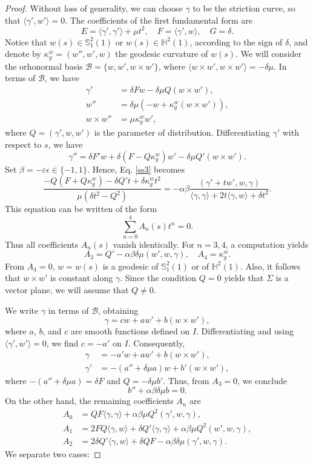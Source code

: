 \documentclass[a4paper,12pt]{amsart}
\theoremstyle{definition}
\def\h{\mathbb H}
\def\s{\mathbb S}
\begin{document}
\begin{proof}
Without loss of generality, we can choose $\gamma$ to be the striction curve, so that $ \langle \gamma',w'\rangle=0$. The coefficients of  the first fundamental form are
$$
E=\langle \gamma',\gamma' \rangle +\mu t^2, \quad F=\langle \gamma',w\rangle, \quad G=\delta.
$$ 
Notice that $w(s)\in \s_1^2(1)$ or $w(s)\in \h^2(1)$, according to the sign of $\delta$, and denote by $\kappa_g^w=(w'',w',w)$ the geodesic curvature of $w(s)$. We will consider the orhonormal basis $\mathcal{B}=\{w,w',w\times w' \}$, where $\langle w\times w', w\times w' \rangle =-\delta \mu$. In terms of $\mathcal{B}$, we have
\begin{align*}
\gamma'&=\delta F w-\delta \mu Q (w \times w'), \\
w''&=\delta \mu (-w+\kappa_g^w(w\times w')), \\
w\times w''&=\mu \kappa_g^w w',
\end{align*}
where $Q=(\gamma',w,w')$ is the parameter of distribution. Differentiating $\gamma'$ with respect to $s$, we have
$$
\gamma''=\delta F'w +\delta (F-Q\kappa_g^w)w'-\delta \mu Q' (w\times w').
$$
Set $\beta=-\varepsilon \epsilon \in \{-1,1\}.$ Hence, Eq. \eqref{ss3} becomes
$$
\frac{-Q(F+Q\kappa_g^w)-\delta Q' t +\delta \kappa_g^wt^2}{\mu (\delta t^2-Q^2)}=-\alpha\beta\frac{(\gamma'+tw',w,\gamma)}{\langle \gamma,\gamma\rangle+2t\langle \gamma,w\rangle+\delta t^2}.
$$ 
This equation can be written  of the form $$\sum_{n=0}^4A_n(s)t^n=0.$$ 
Thus all coefficients   $A_n(s)$ vanish identically. For $n=3,4$, a computation yields 
$$
A_3=Q'-\alpha\beta\delta\mu(w',w,\gamma), \quad A_4=\kappa_g^w.
$$
From $A_4=0$,  $w=w(s)$ is a geodesic of $\s_1^2(1)$ or of $ \h^2(1)$. Also, it follows that $w\times w'$ is constant along $\gamma$. Since the condition $Q=0$ yields that $\Sigma$ is a vector plane, we will assume that $Q\neq 0$.

We write $\gamma$ in terms of $\mathcal{B}$, obtaining 
$$
\gamma=cw+aw'+b(w\times w'),
$$
where $a$, $b$, and $c$ are smooth functions defined on $I$.  Differentiating and using $\langle \gamma',w'\rangle=0$, we find $c=-a'$ on $I$. Consequently, 
\begin{align*}
\gamma&=-a'w+aw'+b(w\times w'), \\
\gamma'&=-(a''+\delta\mu a)w+b'(w\times w'),
\end{align*}
where $-(a''+\delta\mu a)=\delta F$ and $Q=-\delta\mu b'$. Thus, from $A_3=0$, we conclude
\begin{equation}
 b''+\alpha\beta\delta\mu b =0. \label{ode1}
\end{equation} 
On the other hand, the remaining coefficients $A_n$ are  
\begin{align*}
A_0&=QF\langle \gamma,\gamma \rangle +\alpha \beta \mu Q^2(\gamma',w,\gamma), \\
A_1&=2FQ\langle \gamma,w \rangle +\delta Q' \langle \gamma,\gamma \rangle+\alpha \beta \mu Q^2 (w',w,\gamma), \\
A_2&=2\delta Q'\langle \gamma,w \rangle +\delta QF-\alpha \beta \delta \mu  (\gamma',w,\gamma).
\end{align*}
We separate two cases:


\end{proof}
\end{document}

